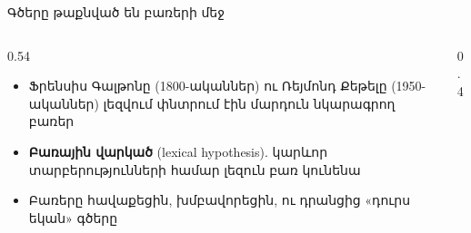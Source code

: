 \begin{frame}{Գծերը թաքնված են բառերի մեջ}
  \begin{columns}[c]
    \begin{column}{0.54\textwidth}
      \begin{itemize}
        \item Ֆրենսիս Գալթոնը (1800-ականներ) ու Ռեյմոնդ Քեթելը (1950-ականներ) լեզվում փնտրում էին մարդուն նկարագրող բառեր
        \item<2-> \textbf{Բառային վարկած} (lexical hypothesis). կարևոր տարբերությունների համար լեզուն բառ կունենա
        \item<3-> Բառերը հավաքեցին, խմբավորեցին, ու դրանցից «դուրս եկան» գծերը
      \end{itemize}
    \end{column}
    \begin{column}{0.4\textwidth}
    \end{column}
  \end{columns}
\end{frame}

